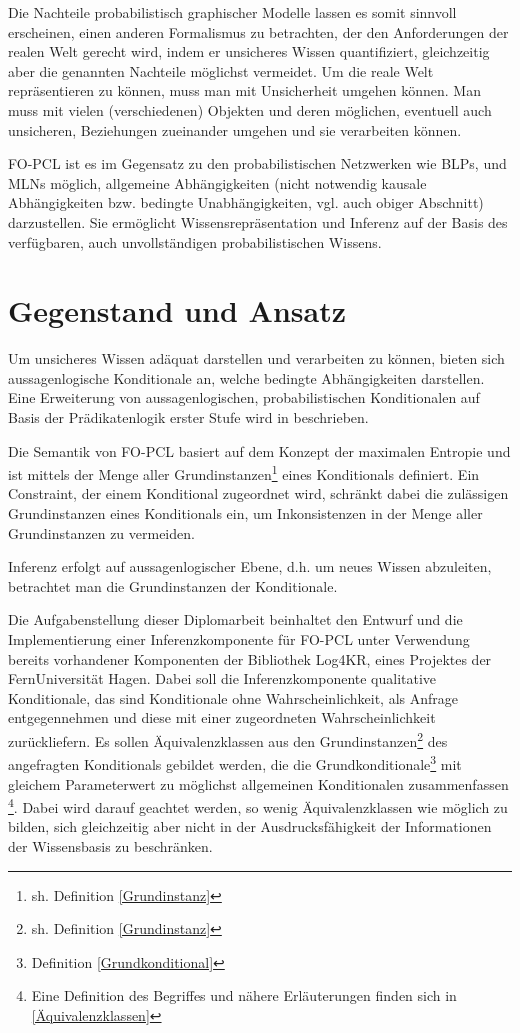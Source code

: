 \documentclass[a4paper, 11pt]{book}
\begin{document}
Die Nachteile probabilistisch graphischer Modelle lassen es somit sinnvoll erscheinen, einen anderen Formalismus zu betrachten, der den Anforderungen der realen Welt  gerecht wird, indem er unsicheres Wissen quantifiziert, gleichzeitig aber die genannten Nachteile möglichst vermeidet. Um die reale Welt repräsentieren zu können, muss man mit Unsicherheit umgehen können. Man muss mit vielen (verschiedenen) Objekten und deren möglichen, eventuell auch unsicheren,  Beziehungen zueinander umgehen und sie verarbeiten können.

FO-PCL ist es im Gegensatz zu den probabilistischen Netzwerken wie BLPs, und MLNs möglich, allgemeine Abhängigkeiten (nicht notwendig kausale Abhängigkeiten bzw. bedingte Unabhängigkeiten, vgl. auch obiger Abschnitt) darzustellen. Sie ermöglicht Wissensrepräsentation und Inferenz auf der Basis des verfügbaren, auch unvollständigen probabilistischen Wissens. 


\section{Gegenstand und Ansatz}
Um unsicheres Wissen adäquat darstellen und verarbeiten zu können, bieten sich aussagenlogische Konditionale  an, welche bedingte Abhängigkeiten darstellen. Eine Erweiterung von aussagenlogischen, probabilistischen Konditionalen auf Basis der Prädikatenlogik erster Stufe wird in \cite[Kap. 6]{Fis10} beschrieben.

 Die Semantik von FO-PCL basiert auf dem Konzept der maximalen Entropie und ist mittels der Menge aller Grundinstanzen\footnote{sh. Definition \ref{Grundinstanz}}  eines Konditionals definiert. Ein Constraint, der einem Konditional zugeordnet wird, schränkt dabei die zulässigen Grundinstanzen eines Konditionals ein, um Inkonsistenzen in der Menge aller Grundinstanzen zu vermeiden.
 
Inferenz erfolgt auf aussagenlogischer Ebene, d.h. um neues Wissen abzuleiten, betrachtet man die Grundinstanzen der Konditionale.


Die Aufgabenstellung dieser Diplomarbeit beinhaltet den Entwurf und die Implementierung einer Inferenzkomponente für FO-PCL unter Verwendung bereits vorhandener Komponenten der Bibliothek Log4KR, eines Projektes der FernUniversität Hagen. Dabei soll die Inferenzkomponente qualitative Konditionale, das sind Konditionale ohne Wahrscheinlichkeit, als Anfrage entgegennehmen und diese mit einer zugeordneten Wahrscheinlichkeit zurückliefern. Es sollen Äquivalenzklassen   aus den Grundinstanzen\footnote{sh. Definition \ref{Grundinstanz}}  des angefragten Konditionals gebildet werden, die die Grundkonditionale\footnote{Definition \ref{Grundkonditional}}  mit gleichem Parameterwert zu möglichst allgemeinen Konditionalen zusammenfassen \footnote{Eine Definition des Begriffes und nähere Erläuterungen finden sich in \ref{Äquivalenzklassen}}. Dabei wird darauf geachtet werden, so wenig Äquivalenzklassen  wie möglich zu bilden, sich gleichzeitig aber nicht in der Ausdrucksfähigkeit der Informationen der Wissensbasis zu beschränken.
\end{document}
